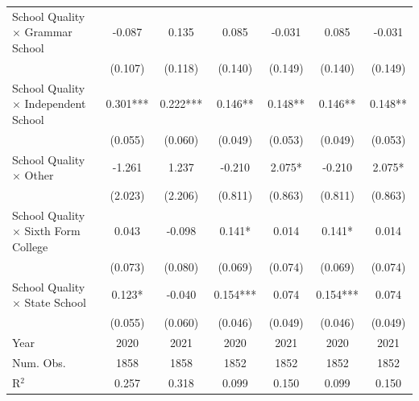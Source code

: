 \begin{table}[htbp]
\begin{threeparttable}
\begin{tabular}{lcccccc}
School Quality $\times$ Grammar School & -0.087 & 0.135 & 0.085 & -0.031 & 0.085 & -0.031 \\
 & (0.107) & (0.118) & (0.140) & (0.149) & (0.140) & (0.149) \\

School Quality $\times$ Independent School & 0.301*** & 0.222*** & 0.146** & 0.148** & 0.146** & 0.148** \\
 & (0.055) & (0.060) & (0.049) & (0.053) & (0.049) & (0.053) \\

School Quality $\times$ Other & -1.261 & 1.237 & -0.210 & 2.075* & -0.210 & 2.075* \\
 & (2.023) & (2.206) & (0.811) & (0.863) & (0.811) & (0.863) \\

School Quality $\times$ Sixth Form College & 0.043 & -0.098 & 0.141* & 0.014 & 0.141* & 0.014 \\
 & (0.073) & (0.080) & (0.069) & (0.074) & (0.069) & (0.074) \\

School Quality $\times$ State School & 0.123* & -0.040 & 0.154*** & 0.074 & 0.154*** & 0.074 \\
 & (0.055) & (0.060) & (0.046) & (0.049) & (0.046) & (0.049) \\

\midrule
Year & 2020 & 2021 & 2020 & 2021  & 2020 & 2021  \\
Num. Obs. & 1858 & 1858 & 1852 & 1852 & 1852 & 1852 \\
R$^2$ & 0.257 & 0.318 & 0.099 & 0.150 & 0.099 & 0.150 \\


\end{tabular}
\end{threeparttable}
\end{table}
